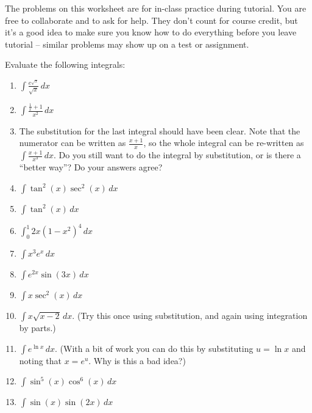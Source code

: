 \documentclass[12pt]{article}
\newcommand{\di}{\displaystyle}
\begin{document}
\thispagestyle{fancy}
The problems on this worksheet are for in-class practice during tutorial. You are free to collaborate and to ask for help. They don't count for course credit, but it's a good idea to make sure you know how to do everything before you leave tutorial -- similar problems may show up on a test or assignment.

\bigskip

Evaluate the following integrals:
\begin{multicols}{2}
 \begin{enumerate}
 \item  $\di \int \frac{e^{\sqrt{x}}}{\sqrt{x}}\,dx$

 \item $\di \int \frac{\frac{1}{x}+1}{x^2}\,dx$

 \item The substitution for the last integral should have been clear. Note that the numerator can be written as $\frac{x+1}{x}$, so the whole integral can be re-written as $\di \int \frac{x+1}{x^3}\,dx$. Do you still want to do the integral by substitution, or is there a ``better way''? Do your answers agree?

 \item $\di \int \tan^2(x)\sec^2(x)\,dx$

 \item $\di \int \tan^2(x)\,dx$

 \item $\di \int_0^1 2x(1-x^2)^4\,dx$

 \item $\di \int x^3e^x\,dx$
 
 \item $\di \int e^{2x}\sin(3x)\,dx$

 \item $\di \int x\sec^2(x)\,dx$

 \item $\di \int x\sqrt{x-2}\,dx$. (Try this once using substitution, and again using integration by parts.)

 \item $\di \int e^{\ln x}\,dx$. (With a bit of work you can do this by substituting $u=\ln x$ and noting that $x=e^u$. Why is this a bad idea?)

 \item $\di \int \sin^5(x)\cos^6(x)\,dx$

 \item $\di \int \sin(x)\sin(2x)\,dx$


\end{enumerate}
\end{multicols}
\end{document}

